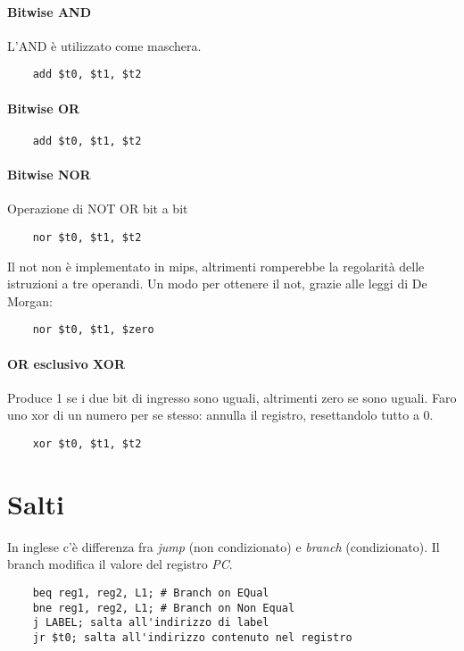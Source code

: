 \documentclass[class=book, crop=false]{standalone}
\begin{document}
\paragraph{Bitwise AND}
L'AND è utilizzato come maschera.\\
\begin{verbatim}
	add $t0, $t1, $t2
\end{verbatim}

\paragraph{Bitwise OR}
\begin{verbatim}
	add $t0, $t1, $t2
\end{verbatim}

\paragraph{Bitwise NOR}
Operazione di NOT OR bit a bit\\
\begin{verbatim}
	nor $t0, $t1, $t2
\end{verbatim}
Il not non è implementato in mips, altrimenti romperebbe la regolarità delle istruzioni a tre operandi. Un modo per ottenere il not, grazie alle leggi di De Morgan:\\
\begin{verbatim}
	nor $t0, $t1, $zero
\end{verbatim}

\paragraph{OR esclusivo XOR}
Produce 1 se i due bit di ingresso sono uguali, altrimenti zero se sono uguali. Faro uno xor di un numero per se stesso: annulla il registro, resettandolo tutto a 0.
\begin{verbatim}
	xor $t0, $t1, $t2
\end{verbatim}

\section{Salti}
In inglese c'è differenza fra \emph{jump} (non condizionato) e \emph{branch} (condizionato). Il branch modifica il valore del registro \emph{PC}.\\
\begin{verbatim}
	beq reg1, reg2, L1; # Branch on EQual
	bne reg1, reg2, L1; # Branch on Non Equal
	j LABEL; salta all'indirizzo di label
	jr $t0; salta all'indirizzo contenuto nel registro
\end{verbatim}
\end{document}
